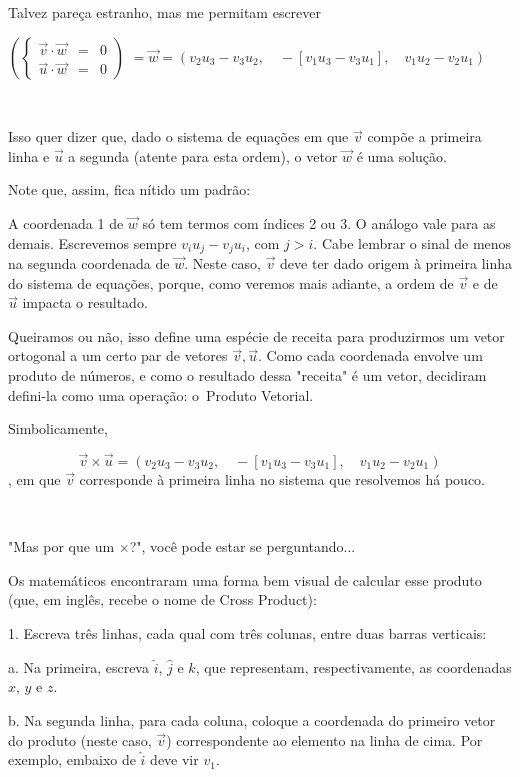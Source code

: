 Talvez pareça estranho, mas me permitam escrever

\( \left( \left \{ \begin{array}{rcl} \vec{v} \cdot \vec{w} &=& 0 \\ \vec{u} \cdot \vec{w} &=& 0 \end{array} \right. \right) \) \( =  \vec{w} = (v_2u_3 - v_3u_2,\quad -[v_1u_3 - v_3u_1],\quad v_1u_2 - v_2u_1) \)

 

Isso quer dizer que, dado o sistema de equações em que \(\vec{v}\) compõe a primeira linha e \(\vec{u}\) a segunda (atente para esta ordem), o vetor \(\vec{w}\) é uma solução.

Note que, assim, fica nítido um padrão:

A coordenada 1 de \(\vec{w}\) só tem termos com índices 2 ou 3. O análogo vale para as demais.
Escrevemos sempre \(v_iu_j - v_ju_i\), com \(j > i\). Cabe lembrar o sinal de menos na segunda coordenada de \(\vec{w}\). Neste caso, \(\vec{v}\) deve ter dado origem à primeira linha do sistema de equações, porque, como veremos mais adiante, a ordem de \(\vec{v}\) e de \(\vec{u}\) impacta o resultado.

Queiramos ou não, isso define uma espécie de receita para produzirmos um vetor ortogonal a um certo par de vetores \(\vec{v}, \vec{u}\). Como cada coordenada envolve um produto de números, e como o resultado dessa "receita" é um vetor, decidiram defini-la como uma operação: o Produto Vetorial.

Simbolicamente,

\[
\vec{v} \times \vec{u} = (v_2u_3 - v_3u_2,\quad -[v_1u_3 - v_3u_1],\quad v_1u_2 - v_2u_1)
\], em que \(\vec{v}\) corresponde à primeira linha no sistema que resolvemos há pouco.

 

"Mas por que um \(\times\)?", você pode estar se perguntando...

Os matemáticos encontraram uma forma bem visual de calcular esse produto (que, em inglês, recebe o nome de Cross Product):

1. Escreva três linhas, cada qual com três colunas, entre duas barras verticais:

a. Na primeira, escreva \(\hat{i}\), \(\hat{j}\) e \(\hat{k}\), que representam, respectivamente, as coordenadas \(x\), \(y\) e \(z\).

b. Na segunda linha, para cada coluna, coloque a coordenada do primeiro vetor do produto (neste caso, \(\vec{v}\)) correspondente ao elemento na linha de cima. Por exemplo, embaixo de \(\hat{i}\) deve vir \(v_1\).

